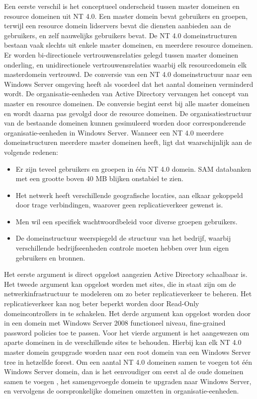 \begin{enumerate}
		 { 
		Een eerste verschil is het conceptueel onderscheid tussen master domeinen en resource domeinen uit NT 4.0. Een master domein bevat gebruikers en groepen, terwijl een resource domein lidservers bevat die diensten aanbieden aan de gebruikers, en zelf nauwelijks gebruikers bevat. De NT 4.0 domeinstructuren bestaan vaak slechts uit enkele master domeinen, en meerdere resource domeinen. Er worden bi-directionele vertrouwensrelaties gelegd tussen master domeinen onderling, en unidirectionele vertrouwensrelaties waarbij elk resourcedomein elk masterdomein vertrouwd. De conversie van een NT 4.0 domeinstructuur naar een Windows Server omgeving heeft als voordeel dat het aantal domeinen verminderd wordt. De organisatie-eenheden van Active Directory vervangen het concept van master en resource domeinen. De conversie begint eerst bij alle master domeinen en wordt daarna pas gevolgd door de resource domeinen. De organisatiestructuur van de bestaande domeinen kunnen gesimuleerd worden door corresponderende organisatie-eenheden in Windows Server. Wanneer een NT 4.0 meerdere domeinstructuren meerdere master domeinen heeft, ligt dat waarschijnlijk aan de volgende redenen:
		\begin{itemize}
			\item Er zijn teveel gebruikers en groepen in één NT 4.0 domein. SAM databanken met een grootte boven 40 MB blijken onstabiel te zien.
			\item Het netwerk heeft verschillende geografische locaties, aan elkaar gekoppeld door trage verbindingen, waarover geen replicatieverkeer gewenst is.
			\item Men wil een specifiek wachtwoordbeleid voor diverse groepen gebruikers.
			\item De domeinstructuur weerspiegeld de structuur van het bedrijf, waarbij verschillende bedrijfseenheden controle moeten hebben over hun eigen gebruikers en bronnen.
		\end{itemize}
		Het eerste argument is direct opgelost aangezien Active Directory schaalbaar is. Het tweede argument kan opgelost worden met sites, die in staat zijn om de netwerkinfrastructuur te modeleren om zo beter replicatieverkeer te beheren. Het replicatieverkeer kan nog beter beperkt worden door Read-Only domeincontrollers in te schakelen. Het derde argument kan opgelost worden door in een domein met Windows Server 2008 functioneel niveau, fine-grained password policies toe te passen. Voor het vierde argument is het aangewezen om aparte domeinen in de verschillende sites te behouden. Hierbij kan elk NT 4.0 master domein geupgrade worden naar een root domein van een Windows Server tree in hetzelfde forest. Om een aantal NT 4.0 domeinen samen te voegen tot één Windows Server domein, dan is het eenvoudiger om eerst al de oude domeinen samen te voegen , het samengevoegde domein te upgraden naar Windows Server, en vervolgens de oorspronkelijke domeinen omzetten in organisatie-eenheden.
}
\end{enumerate}
